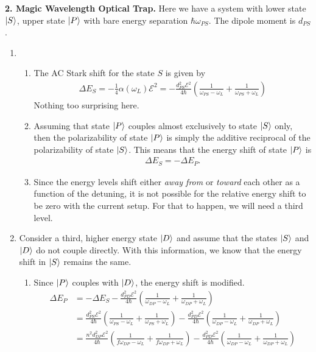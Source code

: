 \documentclass{article}
\theoremstyle{definition}
\newcommand{\al}{\alpha}
\newcommand{\f}[2]{\frac{#1}{#2}}
\newcommand{\lp}{\left(}
\newcommand{\rp}{\right)}
\begin{document}
\noindent \textbf{2. Magic Wavelength Optical Trap.} Here we have a system with lower state $\ket{S}$, upper state $\ket{P}$ with bare energy separation $\hbar \omega_{PS}$. The dipole moment is $d_{PS}$. 

\begin{enumerate}[label=(\alph*)]
	\item 
	
	\begin{enumerate}[label=(\roman*)]
		\item The AC Stark shift for the state $S$ is given by 
		\begin{align*}
			\Delta E_S = -\f{1}{4}\al(\omega_L) \mathcal{E}^2 = -\f{d_{PS}^2\mathcal{E}^2}{4\hbar}\lp \f{1}{\omega_{PS} - \omega_L} + \f{1}{\omega_{PS} + \omega_L} \rp
		\end{align*}
		Nothing too surprising here.
		
		\item Assuming that state $\ket{P}$ couples almost exclusively to state $\ket{S}$ only, then the polarizability of state $\ket{P}$ is simply the additive reciprocal of the polarizability of state $\ket{S}$. This means that the energy shift of state $\ket{P}$ is 
		\begin{align*}
		\Delta E_S = -\Delta E_P.
		\end{align*}
		
		\item Since the energy levels shift either \textit{away from} or \textit{toward} each other as a function of the detuning, it is not possible for the relative energy shift to be zero with the current setup. For that to happen, we will need a third level.
	\end{enumerate}
	
	\item Consider a third, higher energy state $\ket{D}$ and assume that the states $\ket{S}$ and $\ket{D}$ do not couple directly. With this information, we know that the energy shift in $\ket{S}$ remains the same. 
	
	\begin{enumerate}[label=(\roman*)]
		\item Since $\ket{P}$ couples with $\ket{D}$, the energy shift is modified. 
		\begin{align*}
		\Delta E_P &= -\Delta E_S -\f{d_{PD}^2 \mathcal{E}^2}{4\hbar}\lp \f{1}{\omega_{DP} - \omega_L} + \f{1}{\omega_{DP} + \omega_L} \rp\\
		&= \f{d_{PS}^2\mathcal{E}^2}{4\hbar}\lp \f{1}{\omega_{PS} - \omega_L} + \f{1}{\omega_{PS} + \omega_L} \rp -\f{d_{PD}^2 \mathcal{E}^2}{4\hbar}\lp \f{1}{\omega_{DP} - \omega_L} + \f{1}{\omega_{DP} + \omega_L} \rp\\
		&= \f{n^2d_{DP}^2\mathcal{E}^2}{4\hbar}\lp \f{1}{f\omega_{DP} - \omega_L} + \f{1}{f\omega_{DP} + \omega_L} \rp -\f{d_{PD}^2 \mathcal{E}^2}{4\hbar}\lp \f{1}{\omega_{DP} - \omega_L} + \f{1}{\omega_{DP} + \omega_L} \rp\\
		\end{align*}
		

\end{enumerate}
\end{enumerate}
\end{document}
